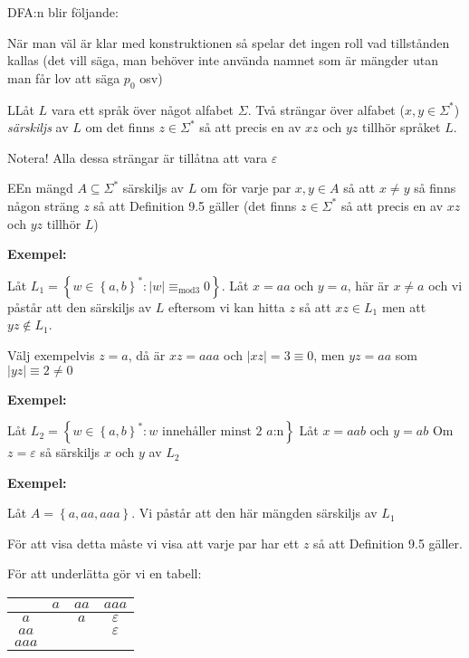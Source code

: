 \par\bigskip
\noindent DFA:n blir följande:
\par\bigskip
\noindent När man väl är klar med konstruktionen så spelar det ingen roll vad tillstånden kallas (det vill säga, man behöver inte använda namnet som är mängder utan man får lov att säga $p_0$ osv)
\par\bigskip
\begin{theo}
  LLåt $L$ vara ett språk över något alfabet $\Sigma$. Två strängar över alfabet ($x,y\in\Sigma^*$) \textit{särskiljs} av $L$ om det finns $z\in\Sigma^*$ så att precis en av $xz$ och $yz$ tillhör språket $L$.
  \par\bigskip
  \noindent Notera! Alla dessa strängar är tillåtna att vara $\varepsilon$
\end{theo}
\par\bigskip
\begin{theo}
  EEn mängd $A\subseteq\Sigma^*$ särskiljs av $L$ om för varje par $x,y\in A$ så att $x\neq y$ så finns någon sträng $z$ så att Definition 9.5 gäller (det finns $z\in\Sigma^*$ så att precis en av $xz$ och $yz$ tillhör $L$)
\end{theo}
\par\bigskip
\noindent\textbf{Exempel:}\par
\noindent Låt $L_1 = \left\{w\in\left\{a,b\right\}^*:\left|w\right|\equiv_{\text{mod}3} 0\right\}$. Låt $x=aa$ och $y=a$, här är $x\neq a$ och vi påstår att den särskiljs av $L$ eftersom vi kan hitta $z$ så att $xz\in L_1$ men att $yz\notin L_1$.\par
\noindent Välj exempelvis $z=a$, då är $xz=aaa$ och $\left|xz\right|=3\equiv0$, men $yz=aa$ som $\left|yz\right|\equiv2\neq0$
\par\bigskip
\noindent\textbf{Exempel:}\par
\noindent Låt $L_2 = \left\{w\in\left\{a,b\right\}^*: w\text{ innehåller minst 2 } a\text{:n}\right\}$ Låt $x=aab$ och  $y=ab$
\noindent Om $z=\varepsilon$ så särskiljs $x$ och $y$ av $L_2$
\par\bigskip
\noindent\textbf{Exempel:}\par
\noindent Låt $A=\left\{a,aa,aaa\right\}$. Vi påstår att den här mängden särskiljs av $L_1$\par
\noindent För att visa detta måste vi visa att varje par har ett $z$ så att Definition 9.5 gäller.\par
\noindent För att underlätta gör vi en tabell:
\par\bigskip
\begin{center}
  \begin{tabular}{c|c|c|c}
    &$a$&$aa$&$aaa$\\
    \hline
    $a$&&$a$&$\varepsilon$\\
    $aa$&&&$\varepsilon$\\
    $aaa$&&&
  \end{tabular}
\end{center}

